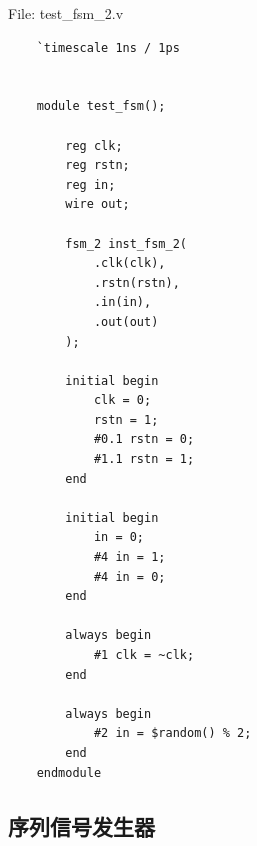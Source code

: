 \documentclass{article}
\begin{document}
File: test\_fsm\_2.v
\begin{lstlisting}
    `timescale 1ns / 1ps


    module test_fsm();

        reg clk;
        reg rstn;
        reg in;
        wire out;

        fsm_2 inst_fsm_2(
            .clk(clk),
            .rstn(rstn),
            .in(in),
            .out(out)
        );

        initial begin
            clk = 0;
            rstn = 1;
            #0.1 rstn = 0;
            #1.1 rstn = 1;
        end

        initial begin
            in = 0;
            #4 in = 1;
            #4 in = 0;
        end

        always begin
            #1 clk = ~clk;
        end

        always begin
            #2 in = $random() % 2;
        end
    endmodule

\end{lstlisting}

\subsection{序列信号发生器}
\end{document}
